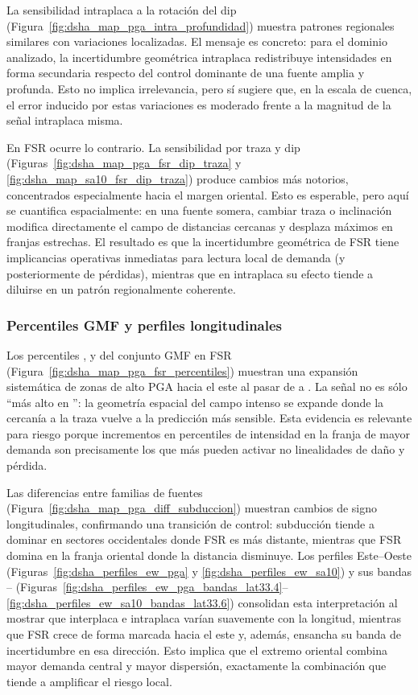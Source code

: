 La sensibilidad intraplaca a la rotación del dip (Figura~\ref{fig:dsha_map_pga_intra_profundidad}) muestra patrones regionales similares con variaciones localizadas. El mensaje es concreto: para el dominio analizado, la incertidumbre geométrica intraplaca redistribuye intensidades en forma secundaria respecto del control dominante de una fuente amplia y profunda. Esto no implica irrelevancia, pero sí sugiere que, en la escala de cuenca, el error inducido por estas variaciones es moderado frente a la magnitud de la señal intraplaca misma.

En FSR ocurre lo contrario. La sensibilidad por traza y dip (Figuras~\ref{fig:dsha_map_pga_fsr_dip_traza} y \ref{fig:dsha_map_sa10_fsr_dip_traza}) produce cambios más notorios, concentrados especialmente hacia el margen oriental. Esto es esperable, pero aquí se cuantifica espacialmente: en una fuente somera, cambiar traza o inclinación modifica directamente el campo de distancias cercanas y desplaza máximos en franjas estrechas. El resultado es que la incertidumbre geométrica de FSR tiene implicancias operativas inmediatas para lectura local de demanda (y posteriormente de pérdidas), mientras que en intraplaca su efecto tiende a diluirse en un patrón regionalmente coherente.

\subsubsection{Percentiles GMF y perfiles longitudinales}
\label{subsubsec:disc_dsha_percentiles_perfiles}

Los percentiles \pSixteen{}, \pFifty{} y \pEightyFour{} del conjunto GMF en FSR (Figura~\ref{fig:dsha_map_pga_fsr_percentiles}) muestran una expansión sistemática de zonas de alto PGA hacia el este al pasar de \pSixteen{} a \pEightyFour{}. La señal no es sólo ``más alto en \pEightyFour{}'': la geometría espacial del campo intenso se expande donde la cercanía a la traza vuelve a la predicción más sensible. Esta evidencia es relevante para riesgo porque incrementos en percentiles de intensidad en la franja de mayor demanda son precisamente los que más pueden activar no linealidades de daño y pérdida.

Las diferencias entre familias de fuentes (Figura~\ref{fig:dsha_map_pga_diff_subduccion}) muestran cambios de signo longitudinales, confirmando una transición de control: subducción tiende a dominar en sectores occidentales donde FSR es más distante, mientras que FSR domina en la franja oriental donde la distancia disminuye. Los perfiles Este--Oeste (Figuras~\ref{fig:dsha_perfiles_ew_pga} y \ref{fig:dsha_perfiles_ew_sa10}) y sus bandas \pSixteen{}--\pEightyFour{} (Figuras~\ref{fig:dsha_perfiles_ew_pga_bandas_lat33.4}--\ref{fig:dsha_perfiles_ew_sa10_bandas_lat33.6}) consolidan esta interpretación al mostrar que interplaca e intraplaca varían suavemente con la longitud, mientras que FSR crece de forma marcada hacia el este y, además, ensancha su banda de incertidumbre en esa dirección. Esto implica que el extremo oriental combina mayor demanda central y mayor dispersión, exactamente la combinación que tiende a amplificar el riesgo local.

